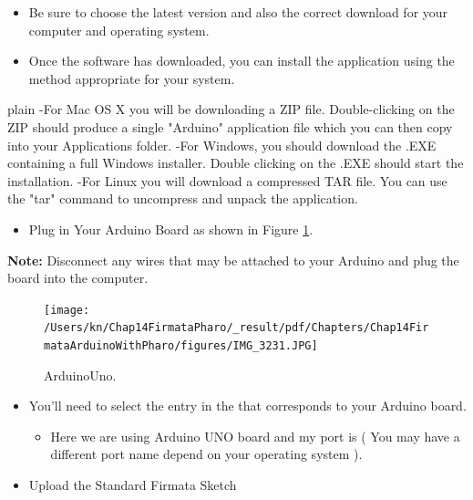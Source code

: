 \documentclass[10pt,twoside,english]{_support/latex/sbabook/sbabook}
\begin{document}
\begin{itemize}
\item Be sure to choose the latest version and also the correct download for your computer and operating system.
\item Once the software has downloaded, you can install the application using the method appropriate for your system. 
\end{itemize}

\begin{displaycode}{plain}
  -For Mac OS X you will be downloading a ZIP file. Double-clicking on the ZIP should produce a single "Arduino" application file which you can then copy into your Applications folder.
  -For Windows, you should download the .EXE containing a full Windows installer. Double clicking on the .EXE should start the installation.
  -For Linux you will download a compressed TAR file. You can use the "tar" command to uncompress and unpack the application.
\end{displaycode}

\begin{itemize}
\item Plug in Your Arduino Board as shown in Figure \ref{ArduinoConnection}.
\end{itemize}

\textbf{Note:} Disconnect any wires that may be attached to your Arduino and plug the board into the computer.

\begin{figure}

\begin{center}
\texttt{[image: /Users/kn/Chap14FirmataPharo/\_result/pdf/Chapters/Chap14FirmataArduinoWithPharo/figures/IMG\_3231.JPG]}\caption{ArduinoUno.\label{ArduinoConnection}}\end{center}
\end{figure}


\begin{itemize}
\item You'll need to select the entry in the  that corresponds to your Arduino board. 
\begin{itemize}
\item Here we are using Arduino UNO board and my port is  ( You may have a different port name depend on your operating system ).
\end{itemize}

\item Upload the Standard Firmata Sketch
\end{itemize}
\end{document}
